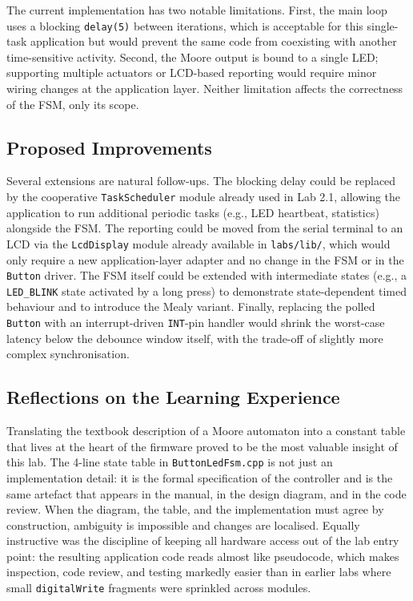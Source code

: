 The current implementation has two notable limitations. First, the main loop uses a blocking \texttt{delay(5)} between iterations, which is acceptable for this single-task application but would prevent the same code from coexisting with another time-sensitive activity. Second, the Moore output is bound to a single LED; supporting multiple actuators or LCD-based reporting would require minor wiring changes at the application layer. Neither limitation affects the correctness of the FSM, only its scope.

\subsection{Proposed Improvements}

Several extensions are natural follow-ups. The blocking delay could be replaced by the cooperative \texttt{TaskScheduler} module already used in Lab 2.1, allowing the application to run additional periodic tasks (e.g., LED heartbeat, statistics) alongside the FSM. The reporting could be moved from the serial terminal to an LCD via the \texttt{LcdDisplay} module already available in \texttt{labs/lib/}, which would only require a new application-layer adapter and no change in the FSM or in the \texttt{Button} driver. The FSM itself could be extended with intermediate states (e.g., a \texttt{LED\_BLINK} state activated by a long press) to demonstrate state-dependent timed behaviour and to introduce the Mealy variant. Finally, replacing the polled \texttt{Button} with an interrupt-driven \texttt{INT}-pin handler would shrink the worst-case latency below the debounce window itself, with the trade-off of slightly more complex synchronisation.

\subsection{Reflections on the Learning Experience}

Translating the textbook description of a Moore automaton into a constant table that lives at the heart of the firmware proved to be the most valuable insight of this lab. The 4-line state table in \texttt{ButtonLedFsm.cpp} is not just an implementation detail: it is the formal specification of the controller and is the same artefact that appears in the manual, in the design diagram, and in the code review. When the diagram, the table, and the implementation must agree by construction, ambiguity is impossible and changes are localised. Equally instructive was the discipline of keeping all hardware access out of the lab entry point: the resulting application code reads almost like pseudocode, which makes inspection, code review, and testing markedly easier than in earlier labs where small \texttt{digitalWrite} fragments were sprinkled across modules.

